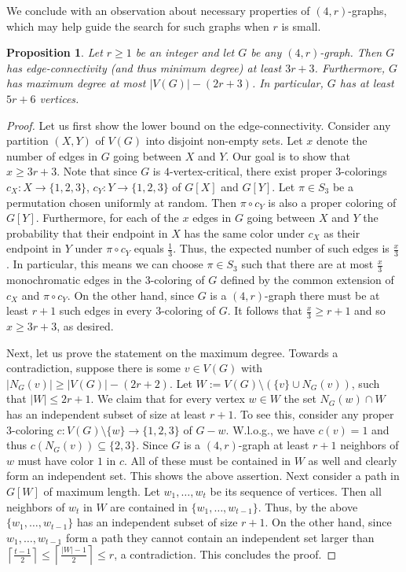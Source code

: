\documentclass[a4paper,10pt,hidelinks]{amsart}
\newtheorem{proposition}[theorem]{Proposition}
\theoremstyle{definition}
\begin{document}
We conclude with an observation about necessary properties of $(4,r)$-graphs, which may help guide the search for such graphs when $r$ is small.
\begin{proposition}\label{4-r-properties}
Let $r\ge 1$ be an integer and let $G$ be any $(4,r)$-graph. Then $G$ has edge-connectivity (and thus minimum degree) at least $3r+3$. Furthermore, $G$ has maximum degree at most $|V(G)|-(2r+3)$. In particular, $G$ has at least $5r+6$ vertices.
\end{proposition}
\begin{proof}
Let us first show the lower bound on the edge-connectivity. Consider any partition $(X,Y)$ of $V(G)$ into disjoint non-empty sets. Let $x$ denote the number of edges in $G$ going between $X$ and $Y$. Our goal is to show that $x\ge 3r+3$. Note that since $G$ is $4$-vertex-critical, there exist proper $3$-colorings $c_X:X\rightarrow \{1,2,3\}$, $c_Y:Y\rightarrow \{1,2,3\}$ of $G[X]$ and $G[Y]$. Let $\pi \in S_3$ be a permutation chosen uniformly at random. Then $\pi\circ c_Y$ is also a proper coloring of $G[Y]$. Furthermore, for each of the $x$ edges in $G$ going between $X$ and $Y$ the probability that their endpoint in $X$ has the same color under $c_X$ as their endpoint in $Y$ under $\pi\circ c_Y$ equals $\frac{1}{3}$. Thus, the expected number of such edges is $\frac{x}{3}$. In particular, this means we can choose $\pi\in S_3$ such that there are at most $\frac{x}{3}$ monochromatic edges in the $3$-coloring of $G$ defined by the common extension of $c_X$ and $\pi\circ c_Y$. On the other hand, since $G$ is a $(4,r)$-graph there must be at least $r+1$ such edges in every $3$-coloring of $G$. It follows that $\frac{x}{3}\ge r+1$ and so $x\ge 3r+3$, as desired.

Next, let us prove the statement on the maximum degree. Towards a contradiction, suppose there is some $v\in V(G)$ with $|N_G(v)|\ge |V(G)|-(2r+2)$. Let $W:=V(G)\setminus (\{v\}\cup N_G(v))$, such that $|W|\le 2r+1$. We claim that for every vertex $w\in W$ the set $N_G(w)\cap W$ has an independent subset of size at least $r+1$. To see this, consider any proper $3$-coloring $c:V(G)\setminus \{w\}\rightarrow \{1,2,3\}$ of $G-w$. W.l.o.g., we have $c(v)=1$ and thus $c(N_G(v))\subseteq \{2,3\}$. Since $G$ is a $(4,r)$-graph at least $r+1$ neighbors of $w$ must have color $1$ in $c$. All of these must be contained in $W$ as well and clearly form an independent set. This shows the above assertion. Next consider a path in $G[W]$ of maximum length. Let $w_1,\ldots,w_t$ be its sequence of vertices. Then all neighbors of $w_t$ in $W$ are contained in $\{w_1,\ldots,w_{t-1}\}$. Thus, by the above $\{w_1,\ldots,w_{t-1}\}$ has an independent subset of size $r+1$. On the other hand, since $w_1,\ldots,w_{t-1}$ form a path they cannot contain an independent set larger than $\left\lceil \frac{t-1}{2}\right\rceil \le \left\lceil \frac{|W|-1}{2} \right\rceil\le r$, a contradiction. This concludes the proof.
\end{proof}
\end{document}
